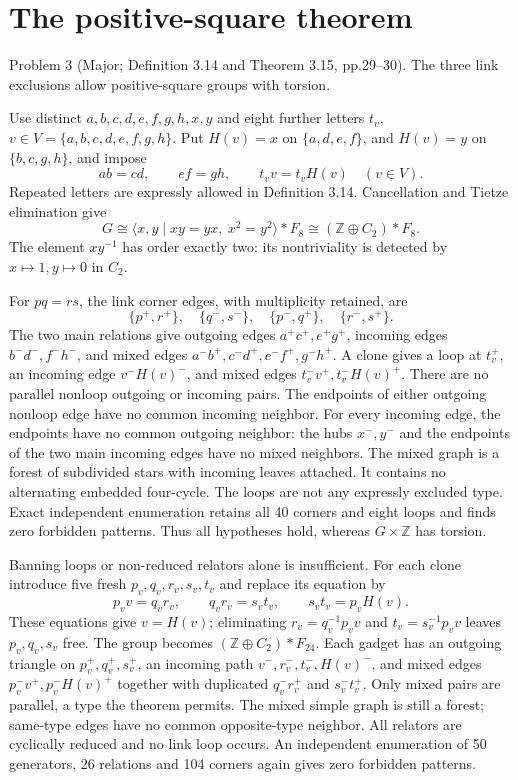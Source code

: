 \documentclass[10pt]{article}
\begin{document}
\section*{The positive-square theorem}
Problem 3 (Major; Definition 3.14 and Theorem 3.15, pp.29–30).  The three link exclusions allow positive-square groups with torsion.\par
Use distinct \(a,b,c,d,e,f,g,h,x,y\) and eight further letters \(t_v\), \(v\in V=\{a,b,c,d,e,f,g,h\}\). Put \(H(v)=x\) on \(\{a,d,e,f\}\), and \(H(v)=y\) on \(\{b,c,g,h\}\), and impose \[ab=cd,\qquad ef=gh,\qquad t_vv=t_vH(v)\quad(v\in V).\] Repeated letters are expressly allowed in Definition 3.14. Cancellation and Tietze elimination give \[G\cong\langle x,y\mid xy=yx,\ x^2=y^2\rangle*F_8
   \cong(\mathbb Z\oplus C_2)*F_8.\] The element \(xy^{-1}\) has order exactly two: its nontriviality is detected by \(x\mapsto1,y\mapsto0\) in \(C_2\).\par
For \(pq=rs\), the link corner edges, with multiplicity retained, are \[\{p^+,r^+\},\quad\{q^-,s^-\},\quad
 \{p^-,q^+\},\quad\{r^-,s^+\}.\] The two main relations give outgoing edges \(a^+c^+,e^+g^+\), incoming edges \(b^-d^-,f^-h^-\), and mixed edges \(a^-b^+,c^-d^+,e^-f^+,g^-h^+\). A clone gives a loop at \(t_v^+\), an incoming edge \(v^-H(v)^-\), and mixed edges \(t_v^-v^+,t_v^-H(v)^+\). There are no parallel nonloop outgoing or incoming pairs. The endpoints of either outgoing nonloop edge have no common incoming neighbor. For every incoming edge, the endpoints have no common outgoing neighbor: the hubs \(x^-,y^-\) and the endpoints of the two main incoming edges have no mixed neighbors. The mixed graph is a forest of subdivided stars with incoming leaves attached. It contains no alternating embedded four-cycle. The loops are not any expressly excluded type. Exact independent enumeration retains all 40 corners and eight loops and finds zero forbidden patterns. Thus all hypotheses hold, whereas \(G\times\mathbb Z\) has torsion.\par
Banning loops or non-reduced relators alone is insufficient. For each clone introduce five fresh \(p_v,q_v,r_v,s_v,t_v\) and replace its equation by \[p_vv=q_vr_v,\qquad q_vr_v=s_vt_v,\qquad s_vt_v=p_vH(v).\] These equations give \(v=H(v)\); eliminating \(r_v=q_v^{-1}p_vv\) and \(t_v=s_v^{-1}p_vv\) leaves \(p_v,q_v,s_v\) free. The group becomes \((\mathbb Z\oplus C_2)*F_{24}\). Each gadget has an outgoing triangle on \(p_v^+,q_v^+,s_v^+\), an incoming path \(v^-,r_v^-,t_v^-,H(v)^-\), and mixed edges \(p_v^-v^+,p_v^-H(v)^+\) together with duplicated \(q_v^-r_v^+\) and \(s_v^-t_v^+\). Only mixed pairs are parallel, a type the theorem permits. The mixed simple graph is still a forest; same-type edges have no common opposite-type neighbor. All relators are cyclically reduced and no link loop occurs. An independent enumeration of 50 generators, 26 relations and 104 corners again gives zero forbidden patterns.\par
\end{document}
